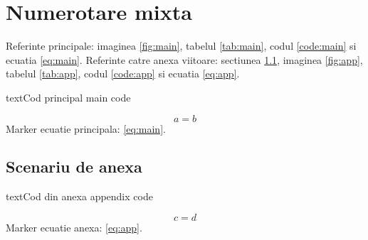\documentclass[a4paper,12pt]{report}
\begin{document}
\chapter{Numerotare mixta}
Referinte principale: imaginea \ref{fig:main}, tabelul \ref{tab:main}, codul \ref{code:main} si ecuatia \eqref{eq:main}.
Referinte catre anexa viitoare: sectiunea \ref{app:one}, imaginea \ref{fig:app}, tabelul \ref{tab:app}, codul \ref{code:app} si ecuatia \eqref{eq:app}.
\begin{code}{text}{Cod principal}
main code
\end{code}
\begin{equation}
  \label{eq:main}
  a = b
\end{equation}
Marker ecuatie principala: \eqref{eq:main}.
\appendixChapter
\section{Scenariu de anexa}\label{app:one}
\begin{code}{text}{Cod din anexa}
appendix code
\end{code}
\begin{equation}
  \label{eq:app}
  c = d
\end{equation}
Marker ecuatie anexa: \eqref{eq:app}.
\end{document}
